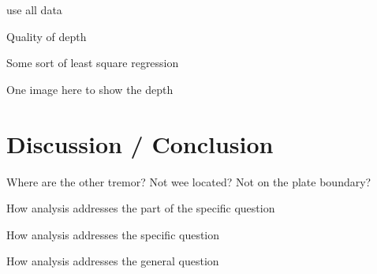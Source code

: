 \documentclass[main.tex]{subfiles}
\begin{document}
use all data

Quality of depth

Some sort of least square regression

One image here to show the depth

\chapter{Discussion / Conclusion}

Where are the other tremor? Not wee located? Not on the plate boundary?

How analysis addresses the part of the specific question

How analysis addresses the specific question

How analysis addresses the general question
\end{document}
